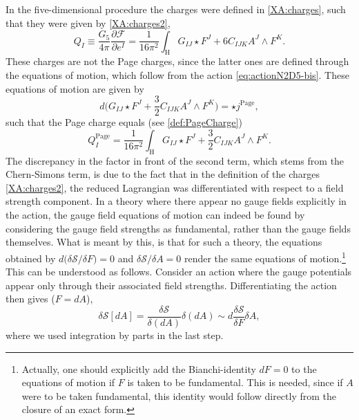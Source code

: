 \documentclass[12pt,twoside]{book}
\begin{document}
In the five-dimensional procedure the charges were defined in \eqref{XA:charges}, such that they were given by \eqref{XA:charges2},
\begin{equation}\label{XA:charges2bis}
Q_{I} \equiv \frac{G_{5}}{4\pi} \frac{\partial \mathcal{F}}{\partial e^{I}}
= \frac{1}{16\pi^{2}} \int_{\mathrm{H}} G_{IJ} \star F^{J} + 6 C_{IJK} A^{J} \wedge F^{K}.
\end{equation}
These charges are not the Page charges, since the latter ones are defined through the equations of motion, which follow from the action \eqref{eq:actionN2D5-bis}. These equations of motion are given by
\begin{equation}
d \big( G_{IJ} \star F^{J} + \frac{3}{2} C_{IJK} A^{J} \wedge F^{K} \big) = \star j^{\mathrm{Page}}, 
\end{equation}
such that the Page charge equals (see \eqref{def:PageCharge})
\begin{equation}\label{XA:PageCharges}
Q_{I}^{\mathrm{Page}} = \frac{1}{16\pi^{2}} \int_{\mathrm{H}} G_{IJ} \star F^{J} + \frac{3}{2} C_{IJK} A^{J} \wedge F^{K}. 
\end{equation}
The discrepancy in the factor in front of the second term, which stems from the Chern-Simons term, is due to the fact that in the definition of the charges \eqref{XA:charges2}, the reduced Lagrangian was differentiated with respect to a field strength component. In a theory where there appear no gauge fields explicitly in the action, the gauge field equations of motion can indeed be found by considering the gauge field strengths as fundamental, rather than the gauge fields themselves. What is meant by this, is that for such a theory, the equations obtained by
$
d \big( \delta \mathcal{S} / \delta F \big) = 0$ and $\delta \mathcal{S} / \delta A = 0
$
render the same equations of motion.\footnote{Actually, one should explicitly add the Bianchi-identity $dF = 0$ to the equations of motion if $F$ is taken to be fundamental. This is needed, since if $A$ were to be taken fundamental, this identity would follow directly from the closure of an exact form.
} This can be understood as follows. Consider an action where the gauge potentials appear only through their associated field strengths. Differentiating the action then gives ($F = dA$),
\begin{equation}
\delta \mathcal{S}[dA] = \frac{\delta \mathcal{S}}{\delta(dA)} \delta(dA)
\sim d\frac{\delta \mathcal{S}}{\delta F} \delta A,
\end{equation}
where we used integration by parts in the last step.
\end{document}
